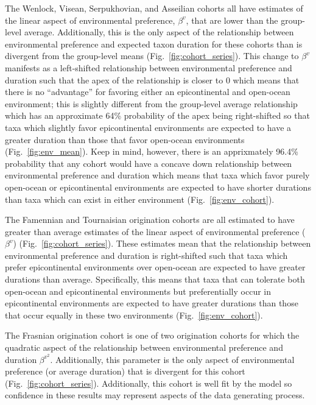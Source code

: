 \documentclass[11pt]{article}
\begin{document}
The Wenlock, Visean, Serpukhovian, and Asseilian cohorts all have estimates of the linear aspect of environmental preference, \(\beta^{v}\), that are lower than the group-level average. Additionally, this is the only aspect of the relationship between environmental preference and expected taxon duration for these cohorts than is divergent from the group-level means (Fig.~\ref{fig:cohort_series}). This change to \(\beta^{v}\) manifests as a left-shifted relationship between environmental preference and duration such that the apex of the relationship is closer to 0 which means that there is no ``advantage'' for favoring either an epicontinental and open-ocean environment; this is slightly different from the group-level average relationship which has an approximate 64\% probability of the apex being right-shifted so that taxa which slightly favor epicontinental environments are expected to have a greater duration than those that favor open-ocean environments (Fig.~\ref{fig:env_mean}). Keep in mind, however, there is an apprixmately 96.4\% probability that any cohort would have a concave down relationship between environmental preference and duration which means that taxa which favor purely open-ocean or epicontinental environments are expected to have shorter durations than taxa which can exist in either environment (Fig.~\ref{fig:env_cohort}).

The Famennian and Tournaisian origination cohorts are all estimated to have greater than average estimates of the linear aspect of environmental preference (\(\beta^{v}\)) (Fig.~\ref{fig:cohort_series}). These estimates mean that the relationship between environmental preference and duration is right-shifted such that taxa which prefer epicontinental environments over open-ocean are expected to have greater durations than average. Specifically, this means that taxa that can tolerate both open-ocean and epicontinental environments but preferentially occur in epicontinental environments are expected to have greater durations than those that occur equally in these two environments (Fig.~\ref{fig:env_cohort}).

The Frasnian origination cohort is one of two origination cohorts for which the quadratic aspect of the relationship between environmental preference and duration \(\beta^{v^{2}}\). Additionally, this parameter is the only aspect of environmental preference (or average duration) that is divergent for this cohort (Fig.~\ref{fig:cohort_series}). Additionally, this cohort is well fit by the model so confidence in these results may represent aspects of the data generating process.
\end{document}

